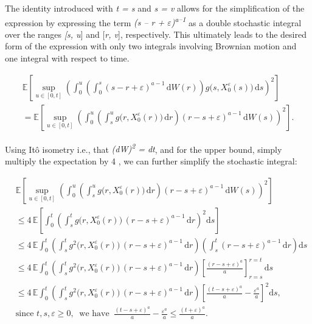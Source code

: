 \documentclass[12pt,a4paper]{report}
\numberwithin{equation}{section}
\begin{document}
The identity introduced with \emph{t = s} and \emph{s = v} allows for
the simplification of the expression by expressing the term \emph{(s --
r + $\varepsilon$)\textsuperscript{a--1}} as a double stochastic integral over the
ranges \emph{{[}s, u}{]} and {[}\emph{r, v}{]}, respectively. This
ultimately leads to the desired form of the expression with only two
integrals involving Brownian motion and one integral with respect to
time.

\[
\begin{gathered}
\mathbb{E}\!\left[\sup_{u\in[0,t]}
\left(\int_{0}^{u}\left(\int_{0}^{s}(s-r+\varepsilon)^{a-1}\,\mathrm{d}W(r)\right)
g\bigl(s,X_{0}^{\varepsilon}(s)\bigr)\,\mathrm{d}s\right)^{2}\right]
\\[2pt]
= \mathbb{E}\!\left[\sup_{u\in[0,t]}
\left(\int_{0}^{u}\left(\int_{s}^{u} g\bigl(r,X_{0}^{\varepsilon}(r)\bigr)\,\mathrm{d}r\right)
(r-s+\varepsilon)^{a-1}\,\mathrm{d}W(s)\right)^{2}\right].
\end{gathered}
\]


Using Itô isometry \cite{lalley2016university_86} i.e., that \emph{(dW)\textsuperscript{2} =
dt}, and for the upper bound, simply multiply the expectation by 4
\cite{llendeto2007modeling_82}, we can further simplify the stochastic integral:

\[
\begin{aligned}
&\mathbb{E}\!\left[\sup_{u\in[0,t]}
\left(\int_{0}^{u}\left(\int_{s}^{u} g\bigl(r,X_{0}^{\varepsilon}(r)\bigr)\,\mathrm{d}r\right)
(r-s+\varepsilon)^{a-1}\,\mathrm{d}W(s)\right)^{2}\right] \\
&\le 4\,\mathbb{E}\!\left[\int_{0}^{t}
\left(\int_{s}^{t} g\bigl(r,X_{0}^{\varepsilon}(r)\bigr)\,(r-s+\varepsilon)^{a-1}\,\mathrm{d}r\right)^{2}\mathrm{d}s\right] \\
&\le 4\,\mathbb{E}\!\int_{0}^{t}
\left(\int_{s}^{t} g^{2}\bigl(r,X_{0}^{\varepsilon}(r)\bigr)\,(r-s+\varepsilon)^{a-1}\,\mathrm{d}r\right)
\left(\int_{s}^{t} (r-s+\varepsilon)^{a-1}\,\mathrm{d}r\right)\mathrm{d}s \\
&\le 4\,\mathbb{E}\!\int_{0}^{t}
\left(\int_{s}^{t} g^{2}\bigl(r,X_{0}^{\varepsilon}(r)\bigr)\,(r-s+\varepsilon)^{a-1}\,\mathrm{d}r\right)
\left[\frac{(r-s+\varepsilon)^{a}}{a}\right]_{r=s}^{r=t}\,\mathrm{d}s \\
&\le 4\,\mathbb{E}\!\int_{0}^{t}
\left(\int_{s}^{t} g^{2}\bigl(r,X_{0}^{\varepsilon}(r)\bigr)\,(r-s+\varepsilon)^{a-1}\,\mathrm{d}r\right)
\left[\frac{(t-s+\varepsilon)^{a}}{a}-\frac{\varepsilon^{a}}{a}\right]^{2}\mathrm{d}s, \\
&\text{since } t,s,\varepsilon\ge 0,\ \text{ we have }\ 
\frac{(t-s+\varepsilon)^{a}}{a}-\frac{\varepsilon^{a}}{a}
\le \frac{(t+\varepsilon)^{a}}{a}.
\end{aligned}
\]
\end{document}
